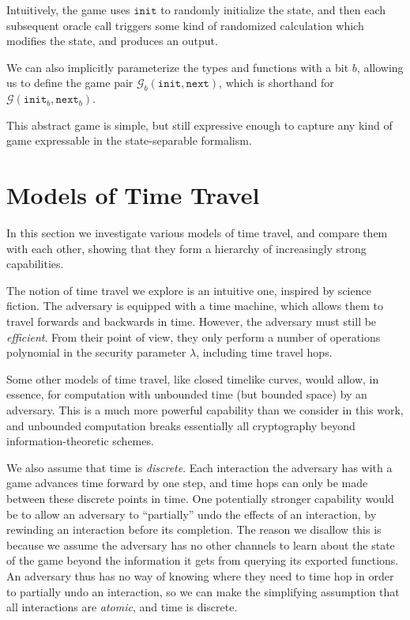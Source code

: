 Intuitively, the game uses $\texttt{init}$ to randomly initialize the state, and
then each subsequent oracle call triggers some kind of randomized calculation
which modifies the state, and produces an output.

We can also implicitly parameterize the types and functions with a bit $b$,
allowing us to define the game pair $\mathcal{G}_b(\texttt{init}, \texttt{next})$,
which is shorthand for $\mathcal{G}(\texttt{init}_b, \texttt{next}_b)$.

This abstract game is simple, but still expressive enough to capture any
kind of game expressable in the state-separable formalism.

\section{Models of Time Travel}

In this section we investigate various models of time travel, and compare
them with each other, showing that they form a hierarchy of increasingly
strong capabilities.

The notion of time travel we explore is an intuitive one, inspired by
science fiction.
The adversary is equipped with a time machine, which allows them
to travel forwards and backwards in time.
However, the adversary must still be \emph{efficient}.
From their point of view, they only perform a number of operations
polynomial in the security parameter $\lambda$, including time travel
hops.

Some other models of time travel, like closed timelike curves, would allow,
in essence, for computation with unbounded time (but bounded space) by an adversary.
This is a much more powerful capability than we consider in this work,
and unbounded computation breaks essentially all cryptography beyond
information-theoretic schemes.

We also assume that time is \emph{discrete}.
Each interaction the adversary has with a game advances time forward
by one step, and time hops can only be made between these discrete points
in time.
One potentially stronger capability would be to allow an adversary
to ``partially'' undo the effects of an interaction, by rewinding
an interaction before its completion.
The reason we disallow this is because we assume the adversary has
no other channels to learn about the state of the game beyond the
information it gets from querying its exported functions.
An adversary thus has no way of knowing where they need to time hop
in order to partially undo an interaction, so we can make the simplifying
assumption that all interactions are \emph{atomic}, and time is discrete.


